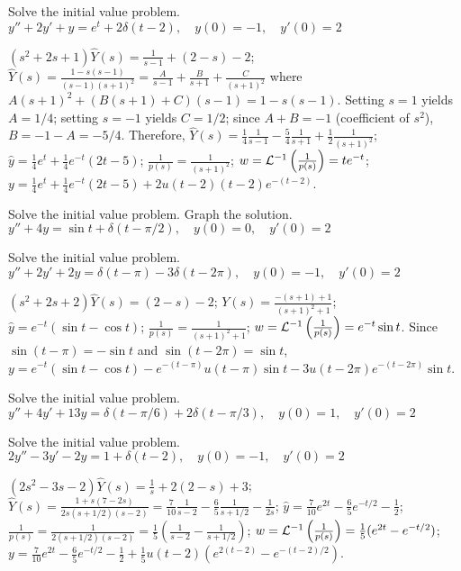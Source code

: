 \documentclass{ximera}
\begin{document}
\begin{problem}\label{exer:8.7.10}
Solve the initial value
problem.
 $y''+2y'+y=e^t+2\delta(t-2), \quad  y(0)=-1,\quad y'(0)=2$

\begin{solution}
$(s^2+2s+1)\hat Y(s)=\frac{1}{s-1}+(2-s)-2$;
$\hat Y(s)=\frac{1-s(s-1)}{(s-1)(s+1)^2}=
\frac{A}{s-1}+\frac{B}{s+1}+\frac{C}{(s+1)^2}$ where
$A(s+1)^2+(B(s+1)+C)(s-1)=1-s(s-1)$. Setting $s=1$
yields $A=1/4$; setting $s=-1$ yields $C=1/2$; since $A+B=-1$
(coefficient of $s^2$), $B=-1-A=-5/4$. Therefore,
$\hat Y(s)=\frac{1}{4}\frac{1}{s-1}-\frac{5}{4}\frac{1}{s+1}+\frac{1}{2}
\frac{1}{(s+1)^2}$;
 $\hat y=\frac{1}{4}e^t+\frac{1}{4}e^{-t}(2t-5)$;
$\frac{1}{p(s)}=\frac{1}{(s+1)^2}$;
$w={\cal L}^{-1}\left(\frac{1}{p(s)}\right)=te^{-t}$;
 $y=\frac{1}{4}e^t+\frac{1}{4}e^{-t}(2t-5)+2u(t-2)(t-2)e^{-(t-2)}$.
\end{solution}
\end{problem}

\begin{problem}\label{exer:8.7.11} Solve the initial value problem.  Graph the solution.
 $y''+4y=\sin t+\delta(t-\pi/2), \quad  y(0)=0,\quad y'(0)=2$
\end{problem}

\begin{problem}\label{exer:8.7.12}
Solve the initial value
problem.
 $y''+2y'+2y=\delta(t-\pi)-3\delta(t-2\pi), \quad  y(0)=-1,\quad y'(0)=2$

\begin{solution}
$(s^2+2s+2)\hat Y(s)=(2-s)-2$;
$Y(s)=\frac{-(s+1)+1}{(s+1)^2+1}$;
$\hat y=e^{-t}(\sin t-\cos t)$;
$\frac{1}{p(s)}=\frac{1}{(s+1)^2+1}$;
$w={\cal L}^{-1}\left(\frac{1}{p(s)}\right)=e^{-t}\sin t$.
Since $\sin(t-\pi)=-\sin t$ and $\sin(t-2\pi)=\sin t$,
$y=e^{-t}(\sin t-\cos t)-e^{-(t-\pi)}u(t-\pi)\sin
t-3u(t-2\pi)e^{-(t-2\pi)}\sin t$.
\end{solution}
\end{problem}

\begin{problem}\label{exer:8.7.13}
Solve the initial value
problem.
$y''+4y'+13y=\delta(t-\pi/6)+2\delta(t-\pi/3), \quad  y(0)=1,\quad y'(0)=2$
\end{problem}

\begin{problem}\label{exer:8.7.14}
Solve the initial value
problem.
$2y''-3y'-2y=1+\delta(t-2), \quad  y(0)=-1,\quad y'(0)=2$

\begin{solution}
$(2s^2-3s-2)\hat Y(s)=\frac{1}{s}+2(2-s)+3$;
$\hat Y(s)=\frac{1+s(7-2s)}{2s(s+1/2)(s-2)}=\frac{7}{10}\frac{1}{s-2}-\frac{6}{5}\frac{1}{s+1/2}-\frac{1}{2s}$;
$\hat y=\frac{7}{10}e^{2t}-\frac{6}{5}e^{-t/2}-\frac{1}{2}$;
$\frac{1}{p(s)}=\frac{1}{2(s+1/2)(s-2)}=\frac{1}{5}\left(\frac{1}{s-2}-\frac{1}{s+1/2}\right)$;
$w={\cal L}^{-1}\left(\frac{1}{p(s)}\right)=\frac{1}{5}(e^{2t}-e^{-t/2})$;
$y=\frac{7}{10}e^{2t}-\frac{6}{5}e^{-t/2}-\frac{1}{2}+\frac{1}{5}u(t-2)
\left(e^{2(t-2)}-e^{-(t-2)/2}\right)$.
\end{solution}
\end{problem}
\end{document}
